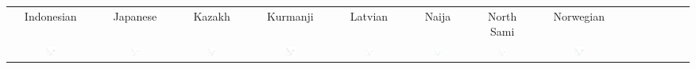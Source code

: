 \documentclass[8pt,letterpaper]{article}
\begin{document}
\begin{tabular}{cccccccccccccc}
Indonesian & Japanese & Kazakh & Kurmanji & Latvian & Naija & North Sami & Norwegian \\
\includegraphics[width=0.12\textwidth]{figures/Indonesian-listener-surprisal-memory.pdf} & \includegraphics[width=0.12\textwidth]{figures/Japanese-listener-surprisal-memory.pdf} & \includegraphics[width=0.12\textwidth]{figures/Kazakh-Adap-listener-surprisal-memory.pdf} & \includegraphics[width=0.12\textwidth]{figures/Kurmanji-Adap-listener-surprisal-memory.pdf} & \includegraphics[width=0.12\textwidth]{figures/Latvian-listener-surprisal-memory.pdf} & \includegraphics[width=0.12\textwidth]{figures/Naija-Adap-listener-surprisal-memory.pdf} & \includegraphics[width=0.12\textwidth]{figures/North_Sami-listener-surprisal-memory.pdf} & \includegraphics[width=0.12\textwidth]{figures/Norwegian-listener-surprisal-memory.pdf}
\\

\end{tabular}
\end{document}
